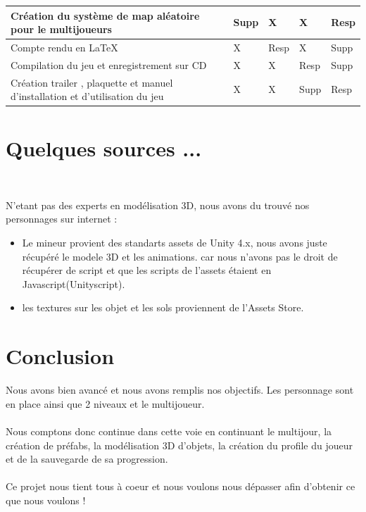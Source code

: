 \documentclass[titlepage, 13px, a4paper]{article}
\begin{document}
{\begin{tabular}{|p{6cm}|p{1.2cm}|p{1.2cm}|p{1.2cm}|p{1.2cm}|}
		\hline
		Création du système de map aléatoire pour le multijoueurs & Supp\footnotemark[2] & X & X & Resp\footnotemark[1] \\
		\hline
		Compte rendu en \LaTeX & X & Resp\footnotemark[1] & X & Supp\footnotemark[2]  \\
		\hline
		Compilation du jeu et enregistrement sur CD & X & X & Resp\footnotemark[1] & Supp\footnotemark[2] \\
		\hline
		Création trailer , plaquette et manuel d'installation et d'utilisation du jeu & X & X & Supp\footnotemark[2] & Resp\footnotemark[1] \\
		\hline
	\end{tabular}
	\label{repartition}		
}





\newpage
\part{Quelques sources ...}
\paragraph{} \hspace{0pt} \\ 
N'etant pas des experts en modélisation 3D, nous avons du trouvé nos personnages sur internet : 
{\begin{itemize}
	\item Le mineur provient des standarts assets de Unity 4.x, nous avons juste récupéré le modele 3D et les animations. 
	car nous n'avons pas le droit de récupérer de script et que les scripts de l'assets étaient en Javascript(Unityscript).
	\item les textures sur les objet et les sols proviennent de l'Assets Store.
\end{itemize}}






\newpage

\part{Conclusion}
Nous avons bien avancé et nous avons remplis nos objectifs.
Les personnage sont en place ainsi que 2 niveaux et le multijoueur.
\\ \\
Nous comptons donc continue dans cette voie en continuant le multijour, la création de préfabs, la modélisation 3D d'objets, 
la création du profile du joueur et de la sauvegarde de sa progression.
\\ \\
Ce projet nous tient tous à coeur et nous voulons nous dépasser afin d'obtenir ce que nous voulons ! 
\end{document}
